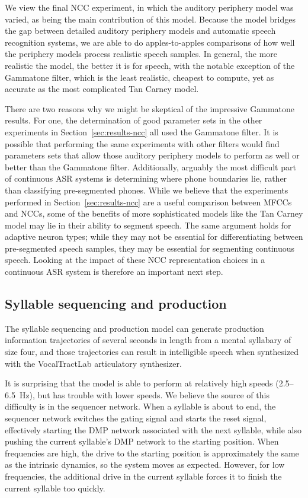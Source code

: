 We view the final NCC experiment,
in which the auditory periphery model was varied,
as being the main contribution
of this model.
Because the model bridges the gap
between detailed auditory periphery models
and automatic speech recognition systems,
we are able to do apples-to-apples comparisons
of how well the periphery models
process realistic speech samples.
In general, the more realistic the model,
the better it is for speech,
with the notable exception of the Gammatone filter,
which is the least realistic,
cheapest to compute,
yet as accurate as
the most complicated Tan Carney model.

There are two reasons why we might
be skeptical of the impressive Gammatone results.
For one, the determination of good parameter sets
in the other experiments in Section~\ref{sec:results-ncc}
all used the Gammatone filter.
It is possible that performing the same
experiments with other filters
would find parameters sets that
allow those auditory periphery models
to perform as well or better than
the Gammatone filter.
Additionally, arguably the most difficult part
of continuous ASR systems is
determining where phone boundaries lie,
rather than classifying pre-segmented phones.
While we believe that the experiments
performed in Section~\ref{sec:results-ncc}
are a useful comparison between MFCCs and NCCs,
some of the benefits of more sophisticated models
like the Tan Carney model
may lie in their ability to segment speech.
The same argument holds
for adaptive neuron types;
while they may not be essential
for differentiating between pre-segmented speech samples,
they may be essential for
segmenting continuous speech.
Looking at the impact of these
NCC representation choices
in a continuous ASR system
is therefore an important next step.

\subsection{Syllable sequencing and production}

The syllable sequencing and production model
can generate production information trajectories
of several seconds in length
from a mental syllabary of size four,
and those trajectories can result in
intelligible speech when synthesized
with the VocalTractLab articulatory synthesizer.

It is surprising that the model is able
to perform at relatively high speeds
(2.5--6.5~Hz),
but has trouble with lower speeds.
We believe the source of this difficulty
is in the sequencer network.
When a syllable is about to end,
the sequencer network
switches the gating signal
and starts the reset signal,
effectively starting the
DMP network associated with the next syllable,
while also pushing the current syllable's
DMP network to the starting position.
When frequencies are high,
the drive to the starting position
is approximately the same as the
intrinsic dynamics, so the system
moves as expected.
However, for low frequencies,
the additional drive in the current syllable
forces it to finish the current syllable
too quickly.

